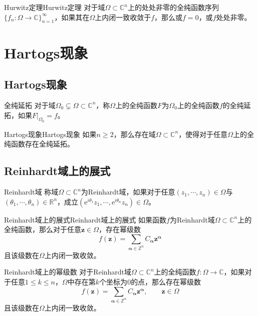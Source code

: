 \documentclass[lang = cn, scheme = chinese, thmcnt = section]{elegantbook}
\newcommand{\R}{\mathbb{R}}            %
\newcommand{\C}{\mathbb{C}}  		   %
\newcommand{\Z}{\mathbb{Z}}            %
\newcommand{\sub}{\subset}             %
\newcommand{\bs}{\boldsymbol}          %
\begin{document}
\begin{theorem}{Hurwitz定理}{Hurwitz定理}
	对于域$\Omega\sub\C^n$上的处处非零的全纯函数序列$\{f_n:\Omega\to\C\}_{n=1}^{\infty}$，如果其在$\Omega$上内闭一致收敛于$f$，那么或$f=0$，或$f$处处非零。
\end{theorem}

\section{Hartogs现象}

\subsection{Hartogs现象}

\begin{definition}{全纯延拓}
	对于域$\Omega_0\subsetneq\Omega\sub\C^n$，称$\Omega$上的全纯函数$F$为$\Omega_0$上的全纯函数$f$的全纯延拓，如果$F|_{\Omega_0}=f$。
\end{definition}

\begin{theorem}{Hartogs现象}{Hartogs现象}
	如果$n\ge 2$，那么存在域$\Omega\sub\C^n$，使得对于任意$\Omega$上的全纯函数存在全纯延拓。
\end{theorem}

\subsection{Reinhardt域上的展式}

\begin{definition}{Reinhardt域}
	称域$\Omega\sub\C^n$为Reinhardt域，如果对于任意$(z_1,\cdots,z_n)\in\Omega$与$(\theta_1,\cdots,\theta_n)\in\R^n$，成立$(\mathrm{e}^{i\theta_1}z_1,\cdots,\mathrm{e}^{i\theta_n}z_n)\in\Omega$。
\end{definition}

\begin{theorem}{Reinhardt域上的展式}{Reinhardt域上的展式}
	如果函数$f$为Reinhardt域$\Omega\sub\C^n$上的全纯函数，那么对于任意$\bs{z}\in \Omega$，存在幂级数
	$$
	f(\bs{z})
	=\sum_{\bs{\alpha}\in\Z^n}C_{\bs{\alpha}}\bs{z}^{\bs{\alpha}}
	$$
	且该级数在$\Omega$上内闭一致收敛。
\end{theorem}

\begin{theorem}{}{Reinhardt域上的幂级数}
	对于Reinhardt域$\Omega\sub\C^n$上的全纯函数$f:\Omega\to\C$，如果对于任意$1\le k\le n$，$\Omega$中存在第$k$个坐标为$0$的点，那么存在幂级数
	$$
	f(\bs{z})
	=\sum_{\bs{\alpha}\in\Z^n}C_{\bs{\alpha}}\bs{z}^{\bs{\alpha}},\qquad \bs{z}\in\Omega
	$$
	且该级数在$\Omega$上内闭一致收敛。
\end{theorem}
\end{document}
